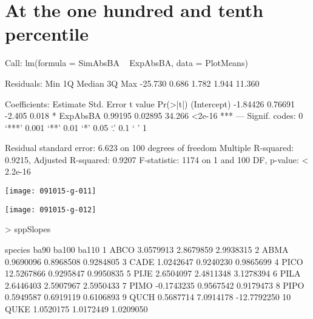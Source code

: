 \documentclass{article}
\begin{document}
\newpage
\section{At the one hundred and tenth percentile}
\begin{Schunk}
\begin{Soutput}
Call:
lm(formula = SimAbsBA ~ ExpAbsBA, data = PlotMeans)

Residuals:
    Min      1Q  Median      3Q     Max 
-25.730   0.686   1.782   1.944  11.360 

Coefficients:
            Estimate Std. Error t value Pr(>|t|)    
(Intercept) -1.84426    0.76691  -2.405    0.018 *  
ExpAbsBA     0.99195    0.02895  34.266   <2e-16 ***
---
Signif. codes:  0 ‘***’ 0.001 ‘**’ 0.01 ‘*’ 0.05 ‘.’ 0.1 ‘ ’ 1

Residual standard error: 6.623 on 100 degrees of freedom
Multiple R-squared:  0.9215,	Adjusted R-squared:  0.9207 
F-statistic:  1174 on 1 and 100 DF,  p-value: < 2.2e-16
\end{Soutput}
\end{Schunk}
\texttt{[image: 091015-g-011]}

\texttt{[image: 091015-g-012]}
\begin{Schunk}
\begin{Sinput}
>   sppSlopes
\end{Sinput}
\begin{Soutput}
   species       ba90     ba100       ba110
1     ABCO  3.0579913 2.8679859   2.9938315
2     ABMA  0.9690096 0.8968508   0.9284805
3     CADE  1.0242647 0.9240230   0.9865699
4     PICO 12.5267866 0.9295847   0.9950835
5     PIJE  2.6504097 2.4811348   3.1278394
6     PILA  2.6446403 2.5907967   2.5950433
7     PIMO -0.1743235 0.9567542   0.9179473
8     PIPO  0.5949587 0.6919119   0.6106893
9     QUCH  0.5687714 7.0914178 -12.7792250
10    QUKE  1.0520175 1.0172449   1.0209050
\end{Soutput}
\end{Schunk}






\newpage
\end{document}
